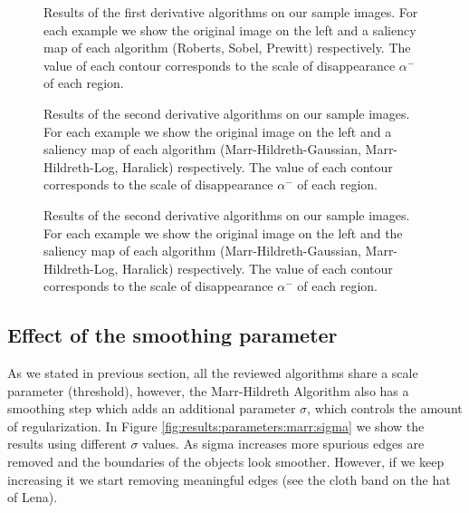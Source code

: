 \documentclass{ipol}
\numberwithin{equation}{section}
\numberwithin{table}{section}
\begin{document}
\begin{figure}[ht]
  \centering
{}
  \caption{Results of the first derivative algorithms on our sample images. For each example we show the original image on the left and a saliency map of each algorithm (Roberts, Sobel, Prewitt) respectively.
  The value of each contour corresponds to the scale of disappearance  $\alpha^-$ of each region.}
  \label{fig:results:parameters:first:saliency:b}
\end{figure}

\begin{figure}[ht]
  \centering
{}
  \caption{Results of the second derivative algorithms on our sample images. For each example we show the original image on the left and a saliency map of each algorithm (Marr-Hildreth-Gaussian, Marr-Hildreth-Log, Haralick) respectively.
  The value of each contour corresponds to the scale of disappearance  $\alpha^-$ of each region.}
  \label{fig:results:parameters:second:saliency:a}
\end{figure}

\begin{figure}[ht]
  \centering
{}
  \caption{Results of the second derivative algorithms on our sample images. For each example we show the original image on the left and the saliency map of each algorithm (Marr-Hildreth-Gaussian, Marr-Hildreth-Log, Haralick) respectively.
  The value of each contour corresponds to the scale of disappearance  $\alpha^-$ of each region.}
  \label{fig:results:parameters:second:saliency:b}
\end{figure}

\subsection{Effect of the smoothing parameter}
As we stated in previous section, all the reviewed algorithms share a scale parameter (threshold), however, the Marr-Hildreth Algorithm also has a smoothing step which adds an additional parameter $\sigma$, which controls the amount of regularization. In Figure \ref{fig:results:parameters:marr:sigma} we show the results using different  $\sigma$ values. As sigma increases more spurious edges are removed and the boundaries of the objects look smoother. However, if we keep increasing it we start removing meaningful edges (see the cloth band on the hat of Lena).
\end{document}

